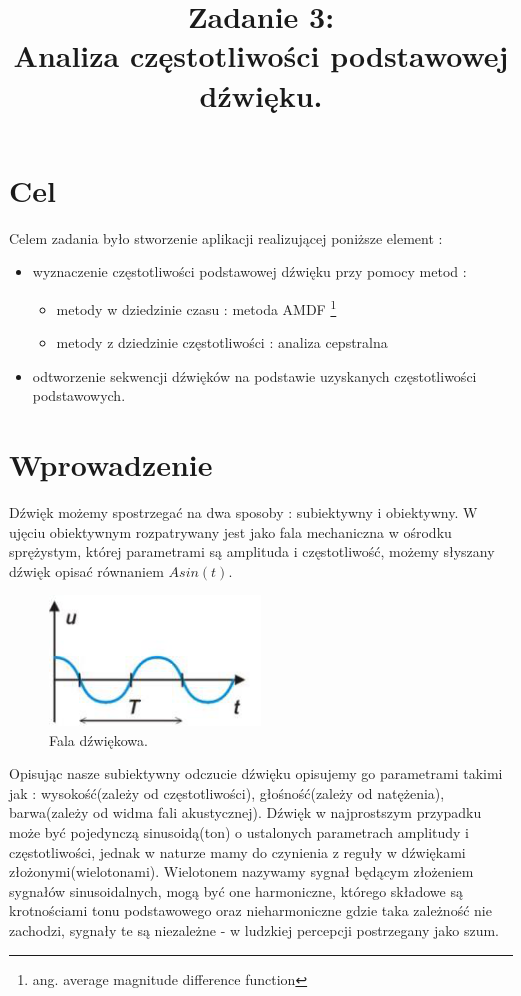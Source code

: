 \documentclass{classrep}
\author{
  \studentinfo{Paweł Musiał}{178726} \and
  \studentinfo{Łukasz Michalski}{178724}
}
\title{Zadanie 3:\\  \textbf {Analiza częstotliwości podstawowej dźwięku.}}
\begin{document}
\maketitle

\addtocounter{footnote}{1}


\section{Cel}

Celem zadania było stworzenie aplikacji realizującej poniższe element :
\begin{itemize}

\item wyznaczenie częstotliwości podstawowej dźwięku przy pomocy metod :
\begin{itemize}
\item metody w dziedzinie czasu : metoda AMDF \footnote{ang. average magnitude difference function
}
\item metody z dziedzinie częstotliwości : analiza cepstralna
\end{itemize}
\item odtworzenie sekwencji dźwięków na podstawie uzyskanych częstotliwości podstawowych.
\end{itemize}


\section{Wprowadzenie}
Dźwięk możemy spostrzegać na dwa sposoby : subiektywny i obiektywny. W ujęciu obiektywnym rozpatrywany jest jako fala mechaniczna w ośrodku sprężystym, której parametrami są amplituda i częstotliwość, możemy słyszany dźwięk opisać równaniem $Asin(t)$. 

\begin{figure}[H]
  \centering
  \includegraphics[width=0.5\textwidth]{Asin}
  \caption{Fala dźwiękowa.}
  \label{fig_dzwiek}
\end{figure}


Opisując nasze subiektywny odczucie dźwięku opisujemy go parametrami takimi jak : wysokość(zależy od częstotliwości), głośność(zależy od natężenia), barwa(zależy od widma fali akustycznej). Dźwięk w najprostszym przypadku może być pojedynczą sinusoidą(ton) o ustalonych parametrach amplitudy i częstotliwości, jednak w naturze mamy do czynienia z reguły w dźwiękami złożonymi(wielotonami). Wielotonem nazywamy sygnał będącym złożeniem sygnałów sinusoidalnych, mogą być one harmoniczne, którego składowe są krotnościami tonu podstawowego oraz nieharmoniczne gdzie taka zależność nie zachodzi, sygnały te są niezależne - w ludzkiej percepcji postrzegany jako szum.
\end{document}
